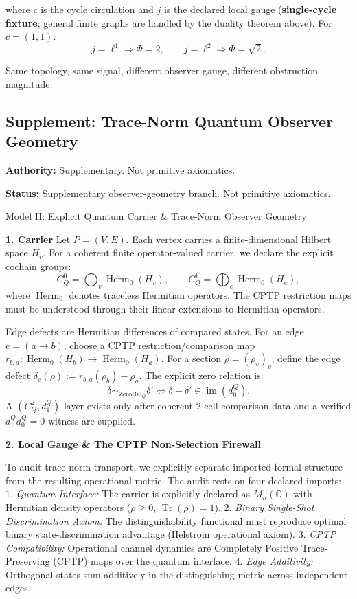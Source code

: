 \documentclass[
  11pt,
]{article}
\begin{document}
where \(c\) is the cycle circulation and \(j\) is the declared local gauge (\textbf{single-cycle fixture}; general finite graphs are handled by the duality theorem above). For \(c=(1,1)\):
\[
j=\ell^1 \Rightarrow \Phi=2,
\qquad
j=\ell^2 \Rightarrow \Phi=\sqrt{2}.
\]

Same topology, same signal, different observer gauge, different obstruction magnitude.

\subsection{Supplement: Trace-Norm Quantum Observer Geometry}\label{supplement-trace-norm-quantum-observer-geometry}

\textbf{Authority:} Supplementary. Not primitive axiomatics.

\textbf{Status:} Supplementary observer-geometry branch. Not primitive axiomatics.

Model II: Explicit Quantum Carrier \& Trace-Norm Observer Geometry

\textbf{1. Carrier}
Let \(P = (V,E)\). Each vertex carries a finite-dimensional Hilbert space \(H_v\). For a coherent finite operator-valued carrier, we declare the explicit cochain groups:
\[
C^0_Q=\bigoplus_v\operatorname{Herm}_0(H_v),
\qquad
C^1_Q=\bigoplus_e\operatorname{Herm}_0(H_e),
\]
where \(\operatorname{Herm}_0\) denotes traceless Hermitian operators. The CPTP restriction maps must be understood through their linear extensions to Hermitian operators.

Edge defects are Hermitian differences of compared states. For an edge \(e=(a\to b)\), choose a CPTP restriction/comparison map \(r_{b,a}: \operatorname{Herm}_0(H_b) \to \operatorname{Herm}_0(H_a)\). For a section \(\rho=(\rho_v)_v\), define the edge defect \(\delta_e(\rho) := r_{b,a}(\rho_b) - \rho_a\).
The explicit zero relation is:
\[
\delta\sim_{\mathrm{ZeroRel}_Q}\delta'
\iff
\delta-\delta'\in\operatorname{im}(d_0^Q).
\]
A \((C^2_Q,d_1^Q)\) layer exists only after coherent 2-cell comparison data and a verified \(d_1^Qd_0^Q=0\) witness are supplied.

\textbf{2. Local Gauge \& The CPTP Non-Selection Firewall}

To audit trace-norm transport, we explicitly separate imported formal structure from the resulting operational metric. The audit rests on four declared imports:
1. \emph{Quantum Interface:} The carrier is explicitly declared as \(M_n(\mathbb{C})\) with Hermitian density operators (\(\rho \ge 0\), \(\operatorname{Tr}(\rho)=1\)).
2. \emph{Binary Single-Shot Discrimination Axiom:} The distinguishability functional must reproduce optimal binary state-discrimination advantage (Helstrom operational axiom).
3. \emph{CPTP Compatibility:} Operational channel dynamics are Completely Positive Trace-Preserving (CPTP) maps over the quantum interface.
4. \emph{Edge Additivity:} Orthogonal states sum additively in the distinguishing metric across independent edges.
\end{document}
